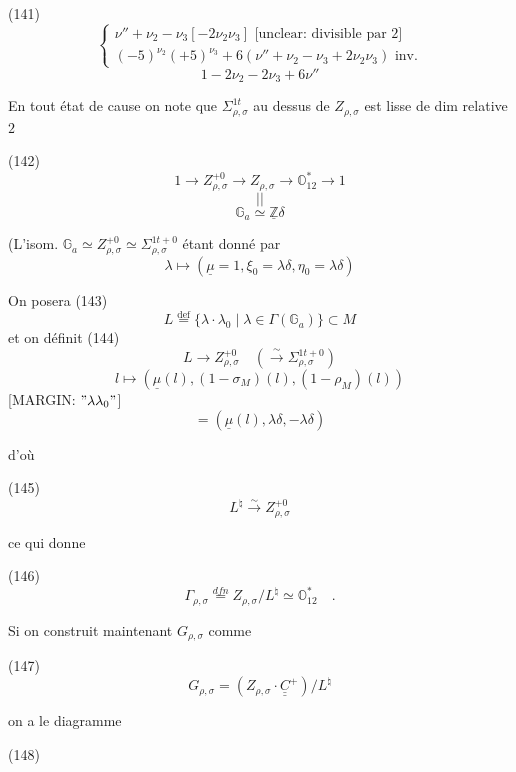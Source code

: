 (141) $$ \begin{cases} \nu'' + \nu_2 - \nu_3 [- 2 \nu_2 \nu_3] \text{ [unclear: divisible par 2]} \\ (-5)^{\nu_2} (+5)^{\nu_3} + 6 (\nu'' + \nu_2 - \nu_3 + 2 \nu_2 \nu_3) \text{ inv.} \end{cases} $$
$$ 1 - 2 \nu_2 - 2 \nu_3 + 6 \nu'' $$

En tout état de cause on note que
$\Sigma_{\rho,\sigma}^{1t}$ au dessus de $Z_{\rho,\sigma}$ est lisse de
dim relative $2$

(142) $$ 1 \to Z_{\rho,\sigma}^{+0} \to Z_{\rho,\sigma} \to \mathbb{O}_{12}^\ast \to 1 $$
$$ || $$
$$ \mathbb{G}_a \simeq \underline{\mathbb{Z}} \delta $$

(L'isom. $\mathbb{G}_a \simeq Z_{\rho,\sigma}^{+0} \simeq \Sigma_{\rho,\sigma}^{1t +0}$ étant donné par
$$ \lambda \longmapsto (\underline{\mu}=1, \xi_0 = \lambda \delta, \eta_0 = \lambda \delta) $$

On posera
(143) $$ L \overset{\text{def}}{=} \{ \lambda \cdot \lambda_0 \mid \lambda \in \Gamma(\mathbb{G}_a) \} \subset M $$
et on définit
(144) $$ L \longrightarrow Z_{\rho,\sigma}^{+0} \quad (\overset{\sim}{\longrightarrow} \Sigma_{\rho,\sigma}^{1t +0}) $$
$$ l \longmapsto (\underline{\mu}(l), (1-\sigma_M)(l), (1-\rho_M)(l)) $$
[MARGIN: $"\lambda \lambda_0"$] $$ = (\underline{\mu}(l), \lambda \delta, - \lambda \delta) $$

\newpage


d'où

(145) $$L^\natural \overset{\sim}{\longrightarrow} Z_{\rho,\sigma}^{+0}$$

ce qui donne

(146) $$\Gamma_{\rho,\sigma} \overset{dfn}{=} Z_{\rho,\sigma}/L^\natural \simeq \mathbb{O}_{12}^* \quad .$$

Si on construit maintenant $G_{\rho,\sigma}$
comme

(147) $$G_{\rho,\sigma} = (Z_{\rho,\sigma} \cdot \underline{\underline{C}}^+) / L^\natural$$

on a le diagramme

(148)

